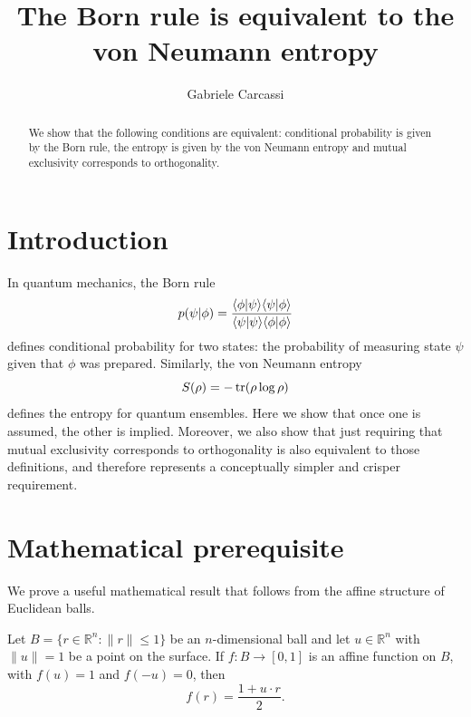 \documentclass{techbrief}
\title{The Born rule is equivalent to the von Neumann entropy}
\author{Gabriele Carcassi}
\begin{document}
	
\maketitle
	
\begin{abstract}
	We show that the following conditions are equivalent: conditional probability is given by the Born rule, the entropy is given by the von Neumann entropy and mutual exclusivity corresponds to orthogonality.
\end{abstract}

\section{Introduction}

In quantum mechanics, the Born rule
\begin{equation}
	p(\psi|\phi) = \frac{\langle \phi | \psi \rangle\langle \psi | \phi \rangle}{\langle \psi | \psi \rangle\langle \phi | \phi \rangle}
\end{equation}
defines conditional probability for two states: the probability of measuring state $\psi$ given that $\phi$ was prepared. Similarly, the von Neumann entropy
\begin{equation}
	S(\rho) = - \operatorname{tr}(\rho \log \rho)
\end{equation}
defines the entropy for quantum ensembles. Here we show that once one is assumed, the other is implied. Moreover, we also show that just requiring that mutual exclusivity corresponds to orthogonality is also equivalent to those definitions, and therefore represents a conceptually simpler and crisper requirement.

\section{Mathematical prerequisite}

We prove a useful mathematical result that follows from the affine structure of Euclidean balls.

\begin{prop}\label{affineBall}
	Let $B=\{r\in\mathbb{R}^n:\|r\|\leq1\}$ be an $n$-dimensional ball and let $u\in\mathbb{R}^n$ with $\|u\|=1$ be a point on the surface. If $f:B\to[0,1]$ is an affine function on $B$, with $f(u)=1$ and $f(-u)=0$, then
	\begin{equation*}
		f(r)=\frac{1+u\cdot r}{2}.
	\end{equation*}
\end{prop}
\end{document}
